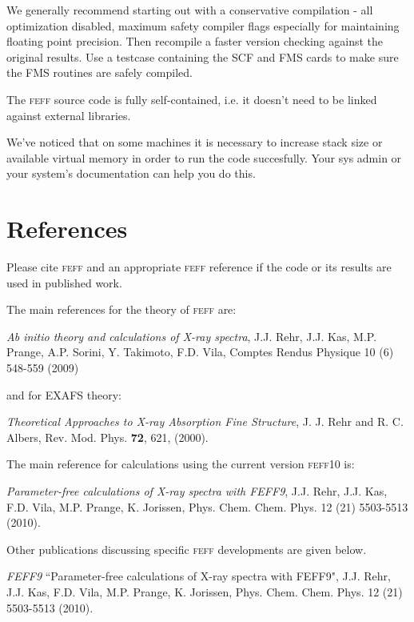 \documentclass[11pt,oneside]{report} %
\newcommand{\program}[1]{\textsc{#1}}
\newcommand{\feff}{\program{feff}}
\newcommand{\vnum}{10}
\newcommand{\feffcur}{\feff\vnum}
\begin{document}
\begin{latexonly}
We generally recommend starting out with a conservative compilation - all optimization disabled,
maximum safety compiler flags especially for maintaining floating point precision.  Then recompile a
faster version checking against the original results.  Use a testcase containing the SCF and FMS cards
to make sure the FMS routines are safely compiled.

The {\feff} source code is fully self-contained, i.e. it doesn't need to be linked against external libraries.

We've noticed that on some machines it is necessary to increase stack size or available virtual memory
in order to run the code succesfully.  Your sys admin or your system's documentation can help you do this.



\chapter{References}
\label{sec:Append-C-Refer}


Please cite {\feff} and an appropriate {\feff} reference if the code or its results are used in published work. 

The main references for the theory of {\feff} are:

\emph{Ab initio theory and calculations of X-ray spectra},
 J.J. Rehr, J.J. Kas, M.P. Prange, A.P. Sorini, Y. Takimoto, F.D. Vila, Comptes Rendus Physique 10 (6) 548-559 (2009)
 
and for EXAFS theory:

\emph{Theoretical Approaches to X-ray Absorption Fine Structure},
J. J. Rehr and R. C. Albers, Rev. Mod. Phys. {\bf72}, 621, (2000).
 

The main reference for calculations using the current version {\feffcur}  is:

\emph{Parameter-free calculations of X-ray spectra with FEFF9}, J.J. Rehr, J.J. Kas, F.D. Vila, M.P. Prange, K. Jorissen, Phys. Chem. Chem. Phys. 12 (21) 5503-5513 (2010).


\medskip
\medskip
Other publications discussing specific {\feff} developments are given below.

\begin{Reflist}

\item [\textit{FEFF9}]  ``Parameter-free calculations of X-ray spectra with FEFF9", J.J. Rehr, J.J. Kas, F.D. Vila, M.P. Prange, K. Jorissen, Phys. Chem. Chem. Phys. 12 (21) 5503-5513 (2010).


\end{Reflist}
\end{latexonly}
\end{document}
